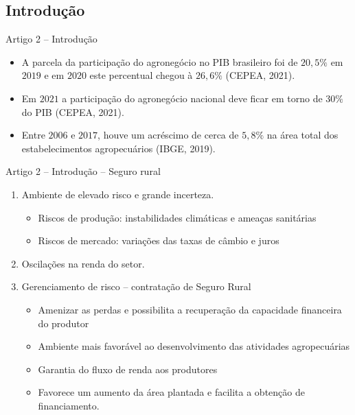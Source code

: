 \documentclass[aspectratio=169]{beamer}
\begin{document}
\subsection{Introdução}

\begin{frame}{Artigo 2 -- Introdução}
\vspace{0.5cm}
		\begin{itemize}
		    \item A parcela da participação do agronegócio no PIB brasileiro foi de $20,5\%$ em $2019$ e em $2020$ este percentual chegou à $26,6\%$  (CEPEA, 2021).
		    \vspace{0.5cm}
		    \item  Em $2021$ a participação do agronegócio nacional deve ficar em torno de $30\%$ do PIB (CEPEA, 2021).
		    \vspace{0.5cm}
		    \item Entre $2006$ e $2017$, houve um acréscimo de cerca de $5,8\%$ na área total dos estabelecimentos agropecuários (IBGE, 2019).
		\end{itemize}
\end{frame}
\begin{frame}{Artigo 2 -- Introdução -- Seguro rural}
	\begin{enumerate}
		\item Ambiente de elevado risco e grande incerteza.
		\begin{itemize}
		    \item Riscos de produção: instabilidades climáticas e ameaças sanitárias
		    \item Riscos de mercado: variações das taxas de câmbio e juros
		\end{itemize}
		\vspace{0.25cm}
		\item Oscilações na renda do setor.
		\vspace{0.25cm}
		\item Gerenciamento de risco -- contratação de Seguro Rural
		\begin{itemize}
		    \item  Amenizar as perdas e possibilita a recuperação da capacidade financeira do produtor
		    \item Ambiente mais favorável ao desenvolvimento das atividades agropecuárias 
		    \item Garantia do fluxo de renda aos produtores
		    \item Favorece um aumento da área plantada e facilita a obtenção de financiamento.
		\end{itemize}
	\end{enumerate}
\end{frame}
\end{document}
